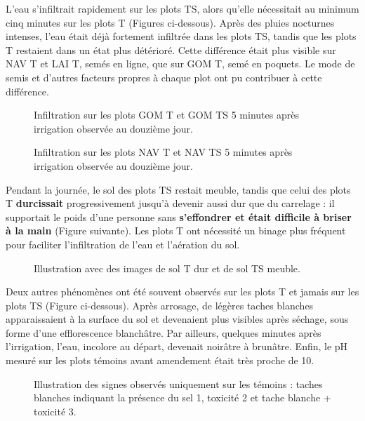 L’eau s’infiltrait rapidement sur les plots TS, alors qu’elle nécessitait au minimum cinq minutes sur les plots T (Figures ci-dessous). 
Après des pluies nocturnes intenses, l’eau était déjà fortement infiltrée dans les plots TS, tandis que les plots T restaient dans un état plus détérioré. 
Cette différence était plus visible sur NAV T et LAI T, semés en ligne, que sur GOM T, semé en poquets. Le mode de semis et d’autres facteurs propres à chaque plot ont pu contribuer à cette différence.
\begin{figure}[H]
    \centering
    \caption{Infiltration sur les plots GOM T et GOM TS 5 minutes après irrigation observée au douzième jour. }
    \label{fig:gombo5}
\end{figure}

\begin{figure}[H]
    \centering
    \caption{Infiltration sur les plots NAV T et NAV TS 5 minutes après irrigation observée au douzième jour. }
    \label{fig:navet5}
\end{figure}

Pendant la journée, le sol des plots TS restait meuble, tandis que celui des plots T \textbf{durcissait} progressivement jusqu’à devenir aussi dur que du carrelage : il supportait le poids d’une personne sans \textbf{s’effondrer et était difficile à briser à la main} (Figure suivante). 
Les plots T ont nécessité un binage plus fréquent pour faciliter l’infiltration de l’eau et l’aération du sol.
\begin{figure}[H]
    \centering
    \caption{Illustration avec des images de sol T dur et de sol TS meuble. }
    \label{fig:dur_meuble5}
\end{figure}

Deux autres phénomènes ont été souvent observés sur les plots T et jamais sur les plots TS (Figure ci-dessous). Après arrosage, de légères taches blanches apparaissaient à la surface du sol et devenaient plus visibles après séchage, 
sous forme d’une efflorescence blanchâtre. Par ailleurs, quelques minutes après l’irrigation, l’eau, incolore au départ, devenait noirâtre à brunâtre. Enfin, le pH mesuré sur les plots témoins avant amendement était très proche de 10.
\begin{figure}[H]
    \centering
    \caption{Illustration des signes observés uniquement sur les témoins : taches blanches indiquant la présence du sel 1, toxicité 2 et tache blanche + toxicité 3. }
    \label{fig:toxique5}
\end{figure}

